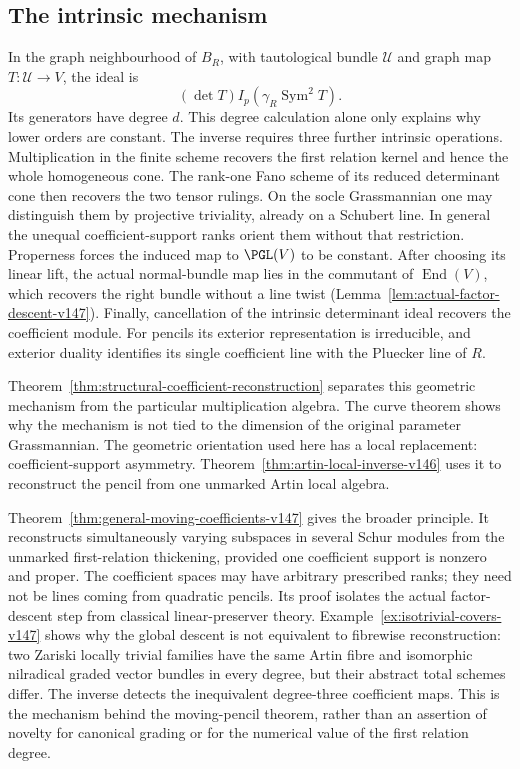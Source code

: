 \documentclass[11pt,reqno]{amsart}
\numberwithin{equation}{section}
\theoremstyle{definition}\newtheorem{definition}[theorem]{Definition}
\theoremstyle{remark}\newtheorem{remark}[theorem]{Remark}
\DeclareMathOperator{\Sym}{Sym}\DeclareMathOperator{\Gr}{Gr}
\DeclareMathOperator{\End}{End}
\begin{document}
\subsection{The intrinsic mechanism}
In the graph neighbourhood of \(B_R\), with tautological bundle
\(\mathcal U\) and graph map \(T:\mathcal U\to V\), the ideal is
\[
                 (\det T)I_p(\gamma_R\Sym^2T).
\]
Its generators have degree \(d\).  This degree calculation alone
only explains why lower orders are constant.  The inverse requires
three further intrinsic operations.  Multiplication in the finite
scheme recovers the first relation kernel and hence the whole
homogeneous cone.  The rank-one Fano scheme of its reduced determinant
cone then recovers the two tensor rulings.  On the socle Grassmannian
one may distinguish them by projective triviality, already on a
Schubert line.  In general the unequal coefficient-support ranks
orient them without that restriction.  Properness forces the induced
map to \(\PGL(V)\) to be constant.  After choosing its linear lift,
the actual normal-bundle map lies in the commutant of \(\End(V)\),
which recovers the right bundle without a line twist
(Lemma~\ref{lem:actual-factor-descent-v147}).  Finally, cancellation of the intrinsic
determinant ideal recovers the coefficient module.  For pencils its
exterior representation is irreducible, and exterior duality identifies
its single coefficient line with the Pluecker line of \(R\).

Theorem~\ref{thm:structural-coefficient-reconstruction} separates this
geometric mechanism from the particular multiplication algebra.  The
curve theorem shows why the mechanism is not tied to the dimension of
the original parameter Grassmannian.  The geometric orientation used here has a local replacement: coefficient-support asymmetry.  Theorem~\ref{thm:artin-local-inverse-v146} uses it to reconstruct the pencil from one unmarked Artin local algebra.

Theorem~\ref{thm:general-moving-coefficients-v147} gives the broader
principle.  It reconstructs simultaneously varying subspaces in
several Schur modules from the unmarked first-relation thickening,
provided one coefficient support is nonzero and proper.  The
coefficient spaces may have arbitrary prescribed ranks; they need
not be lines coming from quadratic pencils.  Its proof isolates the
actual factor-descent step from classical linear-preserver theory.
Example~\ref{ex:isotrivial-covers-v147} shows why the global descent is
not equivalent to fibrewise reconstruction: two Zariski locally
trivial families have the same Artin fibre and isomorphic nilradical
graded vector bundles in every degree, but their abstract total
schemes differ.  The inverse detects the inequivalent degree-three
coefficient maps.  This is the mechanism behind the moving-pencil
theorem, rather than
an assertion of novelty for canonical grading or for the numerical
value of the first relation degree.
\end{document}
